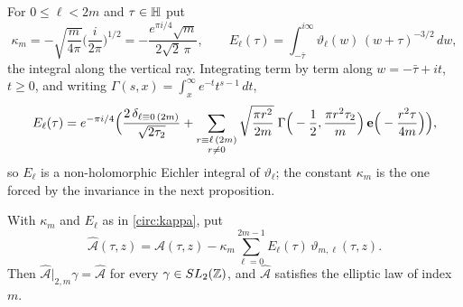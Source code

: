 For $0\le\ell<2m$ and $\tau\in\mathbb{H}$ put
\begin{equation}\label{circ:kappa}
\kappa_m=-\sqrt{\frac m{4\pi}}\Big(\frac i{2\pi}\Big)^{1/2}=-\frac{e^{\pi i/4}\sqrt m}{2\sqrt2\,\pi},\qquad
E_\ell(\tau)=\int_{-\bar\tau}^{i\infty}\vartheta_\ell(w)\,(w+\tau)^{-3/2}\,dw,
\end{equation}
the integral along the vertical ray. Integrating term by term along $w=-\bar\tau+it$, $t\ge0$, and writing $\Gamma(s,x)=\int_x^\infty e^{-t}t^{s-1}\,dt$,
\[
E_\ell(\tau)=e^{-\pi i/4}\Big(\frac{2\,\delta_{\ell\equiv0\,(2m)}}{\sqrt{2\tau_2}}+\sum_{\substack{r\equiv\ell\,(2m)\\ r\ne0}}\sqrt{\frac{\pi r^2}{2m}}\;\Gamma\Big(-\frac12,\frac{\pi r^2\tau_2}m\Big)\,\mathbf e\Big(-\frac{r^2\tau}{4m}\Big)\Big),
\]
so $E_\ell$ is a non-holomorphic Eichler integral of $\vartheta_\ell$; the constant $\kappa_m$ is the one forced by the invariance in the next proposition.

\begin{proposition}\label{tr:prop:Ahat}
With $\kappa_m$ and $E_\ell$ as in \eqref{circ:kappa}, put
\[
\widehat{\mathcal A}(\tau,z)=\mathcal A(\tau,z)-\kappa_m\sum_{\ell=0}^{2m-1}E_\ell(\tau)\,\vartheta_{m,\ell}(\tau,z).
\]
Then $\widehat{\mathcal A}|_{2,m}\gamma=\widehat{\mathcal A}$ for every $\gamma\in SL_2(\mathbb{Z})$, and $\widehat{\mathcal A}$ satisfies the elliptic law of index $m$.
\end{proposition}

